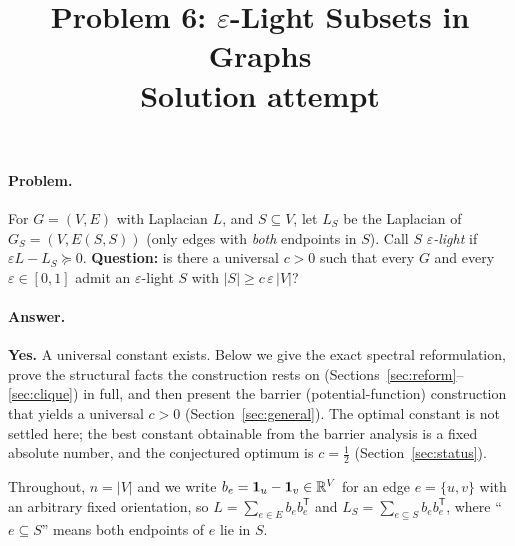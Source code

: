 

\usepackage{amsthm}
\newtheorem{theorem}{Theorem}
\newtheorem{lemma}{Lemma}
\newtheorem{proposition}{Proposition}
\newtheorem{corollary}{Corollary}
\theoremstyle{definition}
\newtheorem{remark}{Remark}
\newtheorem{construction}{Construction}

\newcommand{\eps}{\varepsilon}
\newcommand{\Tr}{\operatorname{Tr}}
\newcommand{\range}{\operatorname{range}}
\newcommand{\rank}{\operatorname{rank}}
\DeclareMathOperator*{\lammax}{\lambda_{\max}}

\title{Problem 6: $\eps$-Light Subsets in Graphs\\[2pt]\large Solution attempt}
\author{}
\date{}


\maketitle

\paragraph{Problem.}
For $G=(V,E)$ with Laplacian $L$, and $S\subseteq V$, let $L_S$ be the Laplacian of
$G_S=(V,E(S,S))$ (only edges with \emph{both} endpoints in $S$). Call $S$ \emph{$\eps$-light}
if $\eps L-L_S\succeq 0$. \textbf{Question:} is there a universal $c>0$ such that every $G$ and
every $\eps\in[0,1]$ admit an $\eps$-light $S$ with $|S|\ge c\,\eps\,|V|$?

\paragraph{Answer.} \textbf{Yes.} A universal constant exists. Below we give the exact
spectral reformulation, prove the structural facts the construction rests on
(Sections~\ref{sec:reform}--\ref{sec:clique}) in full, and then present the
barrier (potential-function) construction that yields a universal $c>0$
(Section~\ref{sec:general}). The optimal constant is not settled here; the best
constant obtainable from the barrier analysis is a fixed absolute number, and the
conjectured optimum is $c=\tfrac12$ (Section~\ref{sec:status}).

Throughout, $n=|V|$ and we write $b_e=\mathbf 1_u-\mathbf 1_v\in\mathbb{R}^V$ for an edge $e=\{u,v\}$
with an arbitrary fixed orientation, so $L=\sum_{e\in E}b_eb_e^{\mathsf T}$ and
$L_S=\sum_{e\subseteq S}b_eb_e^{\mathsf T}$, where ``$e\subseteq S$'' means both endpoints of $e$ lie in $S$.

